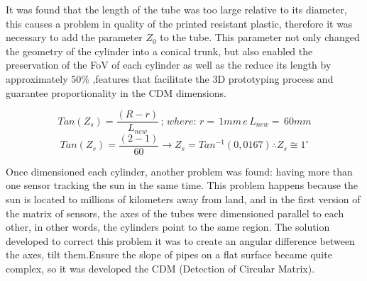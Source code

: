 \documentclass[a4paper,12pt]{article}
\begin{document}
\newpage
It was found that the length of the tube was too large relative to its diameter, this causes a problem in quality of the printed resistant plastic, therefore it was necessary to add the parameter $Z_{0}$ to the tube. This parameter not only changed the geometry of the cylinder into a conical trunk, but also enabled the preservation of the FoV of each cylinder as well as the reduce its length by approximately 50\% ,features that facilitate the 3D prototyping process and guarantee proportionality in the CDM dimensions.
	

$$Tan(Z_{s}) = \frac{(R-r)}{L_{new}}  \, ; \,  where: \, r= \,1mm \,e \, L_{new}= \, 60mm $$
$$Tan(Z_{s}) = \frac{(2-1)}{60}  \longrightarrow   Z_{s} = Tan^{-1}(0,0167) \therefore Z_{s} \cong 1^{\circ} $$

Once dimensioned each cylinder, another problem was found: having more than one sensor tracking the sun in the same time. This problem happens because the sun is located to millions of kilometers away from land, and in the first version of the matrix of sensors, the axes of the tubes were dimensioned parallel to each other, in other words, the cylinders point to the same region. The solution developed to correct this problem it was to create an angular difference between the axes, tilt them.Ensure the slope of pipes on a flat surface became quite complex, so it was  developed the CDM (Detection of Circular Matrix).
\end{document}
